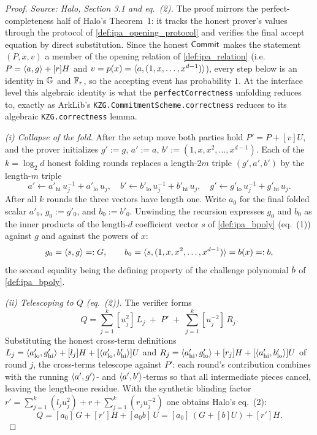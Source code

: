 \begin{proof}
  \textit{Source: Halo, Section 3.1 and eq.~(2).}
  The proof mirrors the perfect-completeness half of Halo's Theorem~1: it tracks
  the honest prover's values through the protocol of
  \cref{def:ipa_opening_protocol} and verifies the final accept equation by
  direct substitution. Since the honest \(\mathsf{Commit}\) makes the statement
  \((P, x, v)\) a member of the opening relation of \cref{def:ipa_relation}
  (i.e.\ \(P = \langle a, g \rangle + [r]H\) and \(v = p(x) = \langle a, (1, x, \dots,
  x^{d-1}) \rangle\)), every step below is an identity in \(\mathbb{G}\) and \(\mathbb{F}_r\), so the
  accepting event has probability \(1\). At the interface level this algebraic
  identity is what the \texttt{perfectCorrectness} unfolding reduces to, exactly
  as ArkLib's \texttt{KZG.CommitmentScheme.correctness} reduces to its algebraic
  \texttt{KZG.correctness} lemma.

  \emph{(i) Collapse of the fold.} After the setup move both parties hold
  \(P' = P + [v]U\), and the prover initializes \(g' := g\), \(a' := a\),
  \(b' := (1, x, x^{2}, \dots, x^{d-1})\). Each of the \(k = \log_{2} d\) honest
  folding rounds replaces a length-\(2m\) triple \((g', a', b')\) by the
  length-\(m\) triple
  \[
    a' \leftarrow a'_{\mathrm{hi}}\, u_{j}^{-1} + a'_{\mathrm{lo}}\, u_{j},
    \quad
    b' \leftarrow b'_{\mathrm{lo}}\, u_{j}^{-1} + b'_{\mathrm{hi}}\, u_{j},
    \quad
    g' \leftarrow g'_{\mathrm{lo}}\, u_{j}^{-1} + g'_{\mathrm{hi}}\, u_{j}.
  \]
  After all \(k\) rounds the three vectors have length one. Write
  \(a_{0}\) for the final folded scalar \(a'_{0}\), \(g_{0} := g'_{0}\), and
  \(b_{0} := b'_{0}\). Unwinding the recursion expresses \(g_{0}\) and \(b_{0}\)
  as the inner products of the length-\(d\) coefficient vector \(s\) of
  \cref{def:ipa_bpoly} (eq.~(1)) against \(g\) and against the powers of \(x\):
  \[
    g_{0} = \langle s, g \rangle =: G,
    \qquad
    b_{0} = \langle s, (1, x, x^{2}, \dots, x^{d-1}) \rangle = b(x) =: b,
  \]
  the second equality being the defining property of the challenge polynomial
  \(b\) of \cref{def:ipa_bpoly}.

  \emph{(ii) Telescoping to \(Q\) (eq.~(2)).} The verifier forms
  \[
    Q = \sum_{j=1}^{k} [u_{j}^{2}]\, L_{j} \;+\; P' \;+\;
        \sum_{j=1}^{k} [u_{j}^{-2}]\, R_{j}.
  \]
  Substituting the honest cross-term definitions
  \(L_{j} = \langle a'_{\mathrm{lo}}, g'_{\mathrm{hi}} \rangle + [l_{j}]H +
  [\langle a'_{\mathrm{lo}}, b'_{\mathrm{hi}} \rangle]U\) and
  \(R_{j} = \langle a'_{\mathrm{hi}}, g'_{\mathrm{lo}} \rangle + [r_{j}]H +
  [\langle a'_{\mathrm{hi}}, b'_{\mathrm{lo}} \rangle]U\) of round \(j\), the
  cross-terms telescope against \(P'\): each round's contribution combines with
  the running \(\langle a', g' \rangle\)- and \(\langle a', b' \rangle\)-terms so that all
  intermediate pieces cancel, leaving the length-one residue. With the synthetic
  blinding factor
  \(r' = \sum_{j=1}^{k} (l_{j} u_{j}^{2}) + r + \sum_{j=1}^{k} (r_{j}
  u_{j}^{-2})\) one obtains Halo's eq.~(2):
  \[
    Q = [a_{0}]\,G + [r']H + [a_{0} b]\,U
      = [a_{0}]\,(G + [b]U) + [r']H.
  \]


\end{proof}
